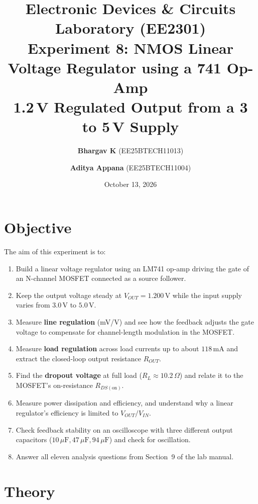 \documentclass[11pt,a4paper]{article}
\title{\textbf{Electronic Devices \& Circuits Laboratory (EE2301)}\\[0.3em]
\Large \textbf{Experiment 8: NMOS Linear Voltage Regulator using a 741 Op-Amp}\\
\large \textbf{1.2\,V Regulated Output from a 3 to 5\,V Supply}}
\author{\textbf{Bhargav K} (EE25BTECH11013) \and \textbf{Aditya Appana} (EE25BTECH11004)}
\date{October 13, 2026}
\begin{document}
\maketitle



\section{Objective}
The aim of this experiment is to:
\begin{enumerate}[leftmargin=1.5em, itemsep=0.2em]
    \item Build a linear voltage regulator using an LM741 op-amp driving the gate of an N-channel MOSFET connected as a source follower.
    \item Keep the output voltage steady at $V_{OUT} = 1.200\,\text{V}$ while the input supply varies from $3.0\,\text{V}$ to $5.0\,\text{V}$.
    \item Measure \textbf{line regulation} (mV/V) and see how the feedback adjusts the gate voltage to compensate for channel-length modulation in the MOSFET.
    \item Measure \textbf{load regulation} across load currents up to about $118\,\text{mA}$ and extract the closed-loop output resistance $R_{OUT}$.
    \item Find the \textbf{dropout voltage} at full load ($R_L \approx 10.2\,\Omega$) and relate it to the MOSFET's on-resistance $R_{DS(\text{on})}$.
    \item Measure power dissipation and efficiency, and understand why a linear regulator's efficiency is limited to $V_{OUT}/V_{IN}$.
    \item Check feedback stability on an oscilloscope with three different output capacitors ($10\,\mu\text{F}, 47\,\mu\text{F}, 94\,\mu\text{F}$) and check for oscillation.
    \item Answer all eleven analysis questions from Section~9 of the lab manual.
\end{enumerate}

\section{Theory}
\end{document}
